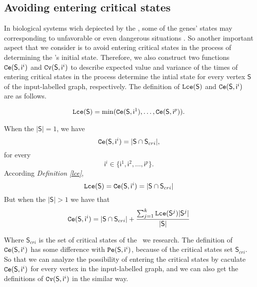 \subsection{Avoiding entering critical states}
In biological systems wich depiected by the \BCNs, some of the genes' states may corresponding to unfavorable or even dangerous situations \cite{Li2014Controllability}. So another important aspect that we consider is to avoid entering critical states in the process of determining the \BCN's initial state. Therefore, we also construct two functions ${\tt Ce}(\mathsf{S}, \mathsf{ i}^{i})$ and ${\tt Cv}(\mathsf{S}, \mathsf{ i}^{i})$ to describe expected value and variance of the times of entering critical states in the process determine the intial state for every vertex $\mathsf{S}$ of the input-labelled graph, respectively. The definition of ${\tt Lce}(\mathsf{S})$ and ${\tt Ce}(\mathsf{S}, \mathsf{ i}^{i})$ are as follows.\\
\begin{definition} \label{lce}
\begin{equation}
\begin{split}
{\tt Lce}(\mathsf{S})= \min({\tt Ce}(\mathsf{S}, \mathsf{ i}^{1}),\ldots,{\tt Ce}(\mathsf{S}, \mathsf{ i}^{p})).
\end{split}
\end{equation}
\end{definition}
\begin{definition} 
When the $|\mathsf{S}|=1$, we have \[{\tt Ce}(\mathsf{S}, \mathsf{ i}^{i})=|\mathsf{S} \cap \mathsf{S}_{cri} |,\]  for every \[\mathsf{ i}^{i} \in \{\mathsf{ i}^{1},\mathsf{ i}^{2},\ldots, \mathsf{ i}^{p}\}.\]  
According {\em Definition \ref{lce}}, 
\[{\tt Lce}(\mathsf{S})={\tt Ce}(\mathsf{S}, \mathsf{ i}^{i})=|\mathsf{S} \cap \mathsf{S}_{cri} |\] 
But when the $|\mathsf{S}|>1$ 
we have that 
\begin{equation}
\begin{split}
{\tt Ce}(\mathsf{S}, \mathsf{ i}^{i})=|\mathsf{S} \cap \mathsf{S}_{cri}| +\frac{\sum_{j=1}^k {\tt Lce}(\mathsf{S}^{j})|\mathsf{S}^{j}|}{ |\mathsf{S}|} 
\end{split}
\end{equation}
\end{definition}

Where $\mathsf{S}_{cri}$ is the set of critical states of the \BCN\ we research. The definition of ${\tt Ce}(\mathsf{S}, \mathsf{ i}^{i})$ has some difference with ${\tt Pe}(\mathsf{S}, \mathsf{ i}^{i})$, because of the critical states set $\mathsf{S}_{cri}$. So that we can analyze the possibility of entering the critical states by caculate ${\tt Ce}(\mathsf{S}, \mathsf{ i}^{i})$ for every vertex in the input-labelled graph, and we can also get the definitions of ${\tt Cv}(\mathsf{S}, \mathsf{ i}^{i})$ in the similar way.

